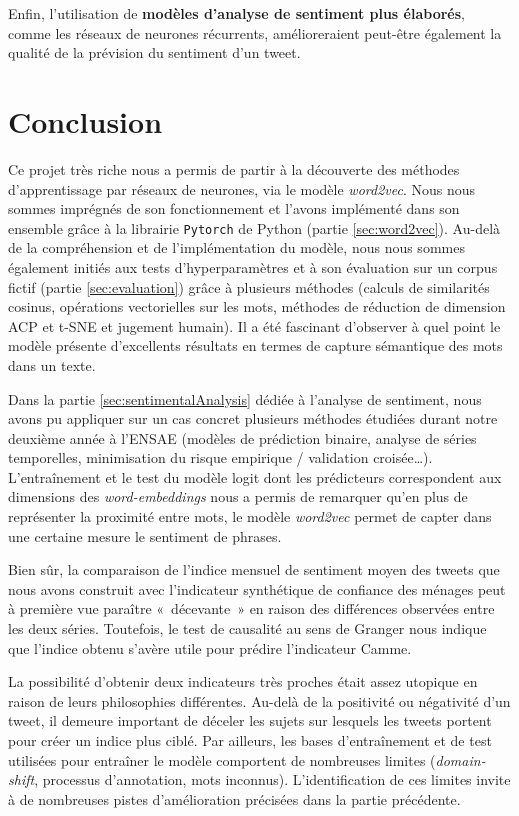 \documentclass[11pt,french,french]{article}
\begin{document}
Enfin, l'utilisation de \textbf{modèles d'analyse de sentiment plus
élaborés}, comme les réseaux de neurones récurrents, amélioreraient
peut-être également la qualité de la prévision du sentiment d'un tweet.

\newpage

\section*{Conclusion}\label{conclusion}

Ce projet très riche nous a permis de partir à la découverte des
méthodes d'apprentissage par réseaux de neurones, via le modèle
\emph{word2vec}. Nous nous sommes imprégnés de son fonctionnement et
l'avons implémenté dans son ensemble grâce à la librairie
\texttt{Pytorch} de Python (partie \ref{sec:word2vec}). Au-delà de la
compréhension et de l'implémentation du modèle, nous nous sommes
également initiés aux tests d'hyperparamètres et à son évaluation sur un
corpus fictif (partie \ref{sec:evaluation}) grâce à plusieurs méthodes
(calculs de similarités cosinus, opérations vectorielles sur les mots,
méthodes de réduction de dimension ACP et t-SNE et jugement humain). Il
a été fascinant d'observer à quel point le modèle présente d'excellents
résultats en termes de capture sémantique des mots dans un texte.

Dans la partie \ref{sec:sentimentalAnalysis} dédiée à l'analyse de
sentiment, nous avons pu appliquer sur un cas concret plusieurs méthodes
étudiées durant notre deuxième année à l'ENSAE (modèles de prédiction
binaire, analyse de séries temporelles, minimisation du risque empirique
/ validation croisée\dots). L'entraînement et le test du modèle logit
dont les prédicteurs correspondent aux dimensions des
\emph{word-embeddings} nous a permis de remarquer qu'en plus de
représenter la proximité entre mots, le modèle \emph{word2vec} permet de
capter dans une certaine mesure le sentiment de phrases.

Bien sûr, la comparaison de l'indice mensuel de sentiment moyen des
tweets que nous avons construit avec l'indicateur synthétique de
confiance des ménages peut à première vue paraître «~décevante~» en
raison des différences observées entre les deux séries. Toutefois, le
test de causalité au sens de Granger nous indique que l'indice obtenu
s'avère utile pour prédire l'indicateur Camme.

La possibilité d'obtenir deux indicateurs très proches était assez
utopique en raison de leurs philosophies différentes. Au-delà de la
positivité ou négativité d'un tweet, il demeure important de déceler les
sujets sur lesquels les tweets portent pour créer un indice plus ciblé.
Par ailleurs, les bases d'entraînement et de test utilisées pour
entraîner le modèle comportent de nombreuses limites
(\emph{domain-shift}, processus d'annotation, mots inconnus).
L'identification de ces limites invite à de nombreuses pistes
d'amélioration précisées dans la partie précédente.
\end{document}
